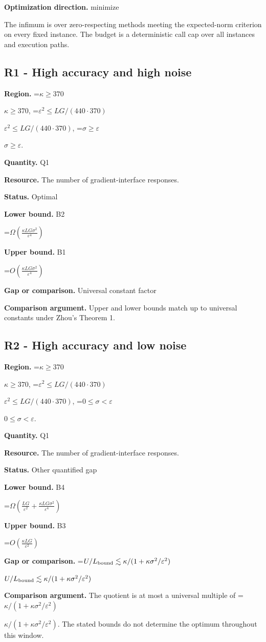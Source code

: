 \documentclass[10pt,a4paper]{article}
\newcommand{\AtlasMath}[1]{\par\begingroup\centering\setbox0=\hbox{$\displaystyle #1$}\ifdim\wd0>1.4\linewidth\typeout{ATLAS WIDE FORMULA: \the\wd0}\fi\ifdim\wd0>\linewidth\resizebox{\linewidth}{!}{\box0}\else\box0\fi\par\endgroup}
\newcommand{\AtlasInlineMath}[1]{\begingroup\setbox0=\hbox{$#1$}\ifdim\wd0>.4\linewidth\endgroup\AtlasMath{#1}\else\endgroup$#1$\fi}
\begin{document}
\textbf{Optimization direction.} minimize

The infimum is over zero-respecting methods meeting the expected-norm criterion on every fixed instance. The budget is a deterministic call cap over all instances and execution paths.

\subsection{R1 - High accuracy and high noise}
\textbf{Region.} \AtlasInlineMath{\kappa\ge370}, \AtlasInlineMath{\varepsilon^2\le LG/(440\cdot370)}, \AtlasInlineMath{\sigma\ge\varepsilon}.

\textbf{Quantity.} Q1

\textbf{Resource.} The number of gradient-interface responses.

\textbf{Status.} Optimal

\textbf{Lower bound.} B2

\AtlasMath{\Omega\!\left(\frac{\kappa L G\sigma^2}{\varepsilon^4}\right)}
\textbf{Upper bound.} B1

\AtlasMath{O\!\left(\frac{\kappa L G\sigma^2}{\varepsilon^4}\right)}
\textbf{Gap or comparison.} Universal constant factor

\textbf{Comparison argument.} Upper and lower bounds match up to universal constants under Zhou's Theorem 1.

\subsection{R2 - High accuracy and low noise}
\textbf{Region.} \AtlasInlineMath{\kappa\ge370}, \AtlasInlineMath{\varepsilon^2\le LG/(440\cdot370)}, \AtlasInlineMath{0\le\sigma<\varepsilon}.

\textbf{Quantity.} Q1

\textbf{Resource.} The number of gradient-interface responses.

\textbf{Status.} Other quantified gap

\textbf{Lower bound.} B4

\AtlasMath{\Omega\!\left(\frac{LG}{\varepsilon^2}+\frac{\kappa LG\sigma^2}{\varepsilon^4}\right)}
\textbf{Upper bound.} B3

\AtlasMath{O\!\left(\frac{\kappa LG}{\varepsilon^2}\right)}
\textbf{Gap or comparison.} \AtlasInlineMath{U/L_{\rm bound}\lesssim\kappa/(1+\kappa\sigma^2/\varepsilon^2)}

\textbf{Comparison argument.} The quotient is at most a universal multiple of \AtlasInlineMath{\kappa/(1+\kappa\sigma^2/\varepsilon^2)}. The stated bounds do not determine the optimum throughout this window.
\end{document}
